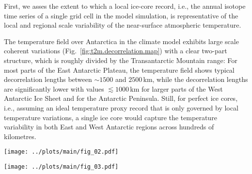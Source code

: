 \documentclass[draft]{agujournal2019}
\begin{document}
First, we asses the extent to which a local ice-core record, i.e., the annual
isotope time series of a single grid cell in the model simulation, is
representative of the local and regional scale variability of the near-surface
atmospheric temperature.

The temperature field over Antarctica in the climate model exhibits large scale
coherent variations (Fig.~\ref{fig:t2m.decorrelation.map}) with a clear two-part
structure, which is roughly divided by the Transantarctic Mountain range: For
most parts of the East Antarctic Plateau, the temperature field shows typical
decorrelation lengths between $\sim1500$ and $2500$\,km, while the decorrelation
lengths are significantly lower with values $\lesssim1000$\,km for larger parts
of the West Antarctic Ice Sheet and for the Antarctic Peninsula.  Still, for
perfect ice cores, i.e., assuming an ideal temperature proxy record that is only
governed by local temperature variations, a single ice core would capture the
temperature variability in both East and West Antarctic regions across hundreds
of kilometres.

\begin{figure*}[t]%
\centering
\texttt{[image: ../plots/main/fig\_02.pdf]}
\caption{%
  Temperature decorrelation lengths across Antarctica. The temperature
  decorrelation lengths ($\tau$, in km) for each Antarctic model grid cell were
  estimated by fitting an exponential model to the correlation--distance
  relationship (cf. Eq.~\ref{eq:t2m.decorr}) obtained from correlating the local
  annual near-surface $T_{2\mathrm{m}}$ time series with the respective
  temperature time series from all other grid cells. Note that only the
  continental grid cells were used for the fit. Although the decorrelation
  lengths show a strong partition between East and West Antarctica, they
  are larger than $1000$\,km at most locations.}
\label{fig:t2m.decorrelation.map}%
\end{figure*}%

\begin{figure*}[t]%
\centering
\texttt{[image: ../plots/main/fig\_03.pdf]}
\caption{%
  The local temperature--isotope relationship across Antarctica. Shown are the
  local correlations for each model grid cell between the annual time series of
  precipitation-weighted oxygen isotope composition and of (\textbf{a})
  near-surface temperature and (\textbf{b}) precipitation-weighted near-surface
  temperature. The difference between the maps clearly demonstrates that
  precipitation intermittency is a major limiting factor for the
  temperature--isotope relationship.}
\label{fig:t2m.oxy.correlation.maps}%
\end{figure*}%
\end{document}
